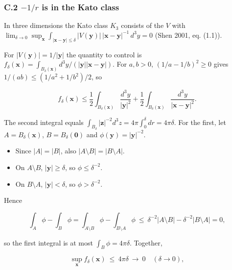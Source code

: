 \documentclass[11pt,a4paper]{article}
\newcommand{\tagmark}[1]{\marginnote{\scriptsize\ttfamily #1}}
\providecommand{\tightlist}{\setlength{\itemsep}{0pt}\setlength{\parskip}{0pt}}
\begin{document}
\hypertarget{c.2--1r-is-in-the-kato-class}{%
\subsubsection{\texorpdfstring{C.2 \(-1/r\) is in the Kato class}{C.2 -1/r is in the Kato class}}\label{c.2--1r-is-in-the-kato-class}}

\tagmark{[V]} In three dimensions the Kato class \(K_3\) consists of the \(V\) with \(\lim_{\delta\to0}\sup_{\mathbf x}\int_{|\mathbf x-\mathbf y|\le\delta}|V(\mathbf y)|\,|\mathbf x-\mathbf y|^{-1}\,d^3y=0\) (Shen 2001, eq. (1.1)).

\tagmark{[D]} For \(|V(\mathbf y)|=1/|\mathbf y|\) the quantity to control is \(f_\delta(\mathbf x)=\int_{B_\delta(\mathbf x)}d^3y/(|\mathbf y||\mathbf x-\mathbf y|)\). For \(a,b>0\), \((1/a-1/b)^2\ge0\) gives \(1/(ab)\le(1/a^2+1/b^2)/2\), so

\begin{equation}
f_\delta(\mathbf x)\le\frac12\int_{B_\delta(\mathbf x)}\frac{d^3y}{|\mathbf y|^2}+\frac12\int_{B_\delta(\mathbf x)}\frac{d^3y}{|\mathbf x-\mathbf y|^2}.\tag{C1}
\end{equation}

The second integral equals \(\int_{B_\delta}|\mathbf z|^{-2}d^3z=4\pi\int_0^\delta dr=4\pi\delta\). For the first, let \(A=B_\delta(\mathbf x)\), \(B=B_\delta(\mathbf 0)\) and \(\phi(\mathbf y)=|\mathbf y|^{-2}\).

\begin{itemize}
\tightlist
\item
  Since \(|A|=|B|\), also \(|A\setminus B|=|B\setminus A|\).
\item
  On \(A\setminus B\), \(|\mathbf y|\ge\delta\), so \(\phi\le\delta^{-2}\).
\item
  On \(B\setminus A\), \(|\mathbf y|<\delta\), so \(\phi>\delta^{-2}\).
\end{itemize}

Hence

\begin{equation}
\int_A\phi-\int_B\phi=\int_{A\setminus B}\phi-\int_{B\setminus A}\phi\ \le\ \delta^{-2}|A\setminus B|-\delta^{-2}|B\setminus A|=0,\tag{C2}
\end{equation}

so the first integral is at most \(\int_B\phi=4\pi\delta\). Together,

\begin{equation}
\sup_{\mathbf x}f_\delta(\mathbf x)\ \le\ 4\pi\delta\ \longrightarrow\ 0\quad(\delta\to0),\tag{C3}
\end{equation}
\end{document}
